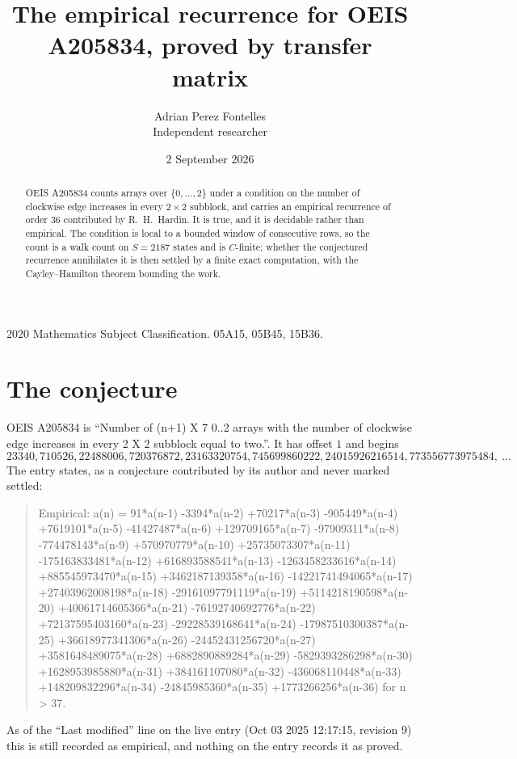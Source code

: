 \documentclass[11pt,a4paper]{article}
\title{The empirical recurrence for OEIS A205834, proved by transfer matrix}
\author{Adrian Perez Fontelles\\ \small Independent researcher}
\date{2 September 2026}
\theoremstyle{plain}
\theoremstyle{definition}
\begin{document}
\maketitle

\begin{abstract}
OEIS A205834 counts arrays over $\{0,\dots,2\}$ under a condition on the number of clockwise edge increases
in every $2\times2$ subblock, and carries an empirical recurrence of order $36$ contributed by
R.~H.~Hardin. It is true, and it is decidable rather than empirical. The condition is local to
a bounded window of consecutive rows, so the count is a walk count on $S=2187$ states and is
$C$-finite; whether the conjectured recurrence annihilates it is then settled by a finite exact
computation, with the Cayley--Hamilton theorem bounding the work.
\end{abstract}

\noindent\small 2020 Mathematics Subject Classification. 05A15, 05B45, 15B36.\normalsize

\section{The conjecture}

OEIS A205834 is ``Number of (n+1) X 7 0..2 arrays with the number of clockwise edge increases in every 2 X 2 subblock equal to two.''. It has offset $1$ and begins
\[
23340, 710526, 22488006, 720376872, 23163320754, 745699860222, 24015926216514, 773556773975484,\ \dots
\]
The entry states, as a conjecture contributed by its author and never marked settled:
\begin{quote}
Empirical: a(n) = 91*a(n-1) -3394*a(n-2) +70217*a(n-3) -905449*a(n-4) +7619101*a(n-5) -41427487*a(n-6) +129709165*a(n-7) -97909311*a(n-8) -774478143*a(n-9) +570970779*a(n-10) +25735073307*a(n-11) -175163833481*a(n-12) +616893588541*a(n-13) -1263458233616*a(n-14) +885545973470*a(n-15) +3462187139358*a(n-16) -14221741494065*a(n-17) +27403962008198*a(n-18) -29161097791119*a(n-19) +5114218190598*a(n-20) +40061714605366*a(n-21) -76192740692776*a(n-22) +72137595403160*a(n-23) -29228539168641*a(n-24) -17987510300387*a(n-25) +36618977341306*a(n-26) -24452431256720*a(n-27) +3581648489075*a(n-28) +6882890889284*a(n-29) -5829393286298*a(n-30) +1628953985880*a(n-31) +384161107080*a(n-32) -436068110448*a(n-33) +148209832296*a(n-34) -24845985360*a(n-35) +1773266256*a(n-36) for n > 37.
\end{quote}
As of the ``Last modified'' line on the live entry (Oct 03 2025 12:17:15, revision 9) this is still
recorded as empirical, and nothing on the entry records it as proved.
\end{document}
